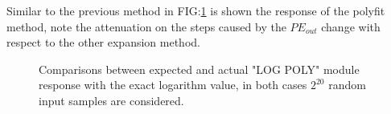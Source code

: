 \documentclass[12pt]{article}
\begin{document}
Similar to the previous method in FIG:\ref{fig:POLY_LOG} is shown the response of the polyfit method, note the attenuation on the steps caused by the $PE_{out}$ change with respect to the other expansion method.
\begin{figure}[h]
    \begin{minipage}[c]{0.5\linewidth}
        \vspace{0pt}
        \centering
    \end{minipage}%
    \hfill%
    \begin{minipage}[c]{0.5\linewidth}
        \vspace{0pt}
        \centering
    \end{minipage}%
    \caption{Comparisons between expected and actual "LOG POLY" module response with the exact logarithm value, in both cases $2^{20}$ random input samples are considered.}
    \label{fig:POLY_LOG}
\end{figure}
\end{document}

